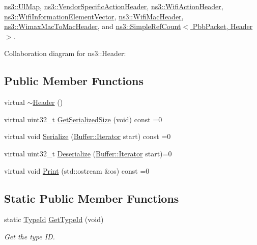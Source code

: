 \hyperlink{classns3_1_1UlMap}{ns3\+::\+Ul\+Map}, \hyperlink{classns3_1_1VendorSpecificActionHeader}{ns3\+::\+Vendor\+Specific\+Action\+Header}, \hyperlink{classns3_1_1WifiActionHeader}{ns3\+::\+Wifi\+Action\+Header}, \hyperlink{classns3_1_1WifiInformationElementVector}{ns3\+::\+Wifi\+Information\+Element\+Vector}, \hyperlink{classns3_1_1WifiMacHeader}{ns3\+::\+Wifi\+Mac\+Header}, \hyperlink{classns3_1_1WimaxMacToMacHeader}{ns3\+::\+Wimax\+Mac\+To\+Mac\+Header}, and \hyperlink{classns3_1_1SimpleRefCount}{ns3\+::\+Simple\+Ref\+Count$<$ Pbb\+Packet, Header $>$}.



Collaboration diagram for ns3\+:\+:Header\+:
\subsection*{Public Member Functions}
\begin{DoxyCompactItemize}
\item 
virtual \hyperlink{classns3_1_1Header_a6ed6ab42b87cc2837de00f301622c96b}{$\sim$\+Header} ()
\item 
virtual uint32\+\_\+t \hyperlink{classns3_1_1Header_a6ef0497eabc1b1fb0ad42738eb73f934}{Get\+Serialized\+Size} (void) const =0
\item 
virtual void \hyperlink{classns3_1_1Header_afb61f1aac69ff8349a6bfe521fab5404}{Serialize} (\hyperlink{classns3_1_1Buffer_1_1Iterator}{Buffer\+::\+Iterator} start) const =0
\item 
virtual uint32\+\_\+t \hyperlink{classns3_1_1Header_a78be9400bb66b2a8543606f395ef5396}{Deserialize} (\hyperlink{classns3_1_1Buffer_1_1Iterator}{Buffer\+::\+Iterator} start)=0
\item 
virtual void \hyperlink{classns3_1_1Header_a2ce1df7579b2ade7bc7302357feac77a}{Print} (std\+::ostream \&os) const =0
\end{DoxyCompactItemize}
\subsection*{Static Public Member Functions}
\begin{DoxyCompactItemize}
\item 
static \hyperlink{classns3_1_1TypeId}{Type\+Id} \hyperlink{classns3_1_1Header_a19c6ed8b6d49bddfe37dc99a7b18d22b}{Get\+Type\+Id} (void)
\begin{DoxyCompactList}\small\item\em Get the type ID. \end{DoxyCompactList}\end{DoxyCompactItemize}
